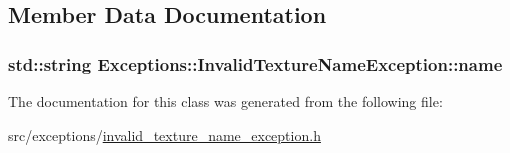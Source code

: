 \subsection{Member Data Documentation}
\hypertarget{class_exceptions_1_1_invalid_texture_name_exception_a01142eb79f940de4fb5989df146716f1}{}
\subsubsection[{name}]{\setlength{\rightskip}{0pt plus 5cm}std\+::string Exceptions\+::\+Invalid\+Texture\+Name\+Exception\+::name\hspace{0.3cm}{\ttfamily [private]}}\label{class_exceptions_1_1_invalid_texture_name_exception_a01142eb79f940de4fb5989df146716f1}


The documentation for this class was generated from the following file\+:\begin{DoxyCompactItemize}
\item 
src/exceptions/\hyperlink{invalid__texture__name__exception_8h}{invalid\+\_\+texture\+\_\+name\+\_\+exception.\+h}\end{DoxyCompactItemize}
